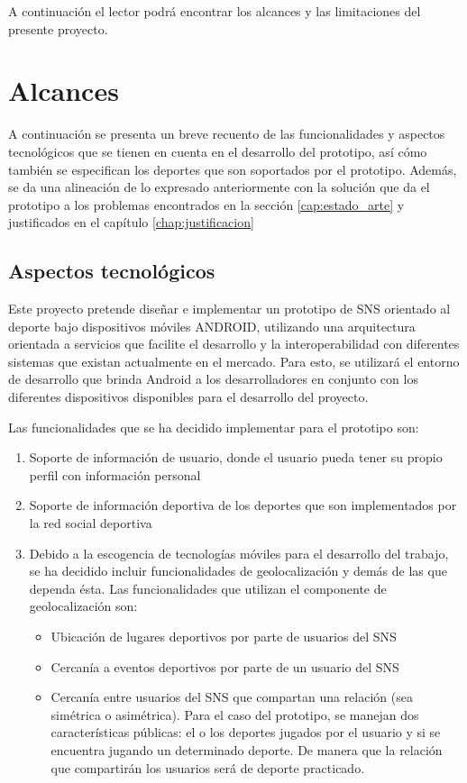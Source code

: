 A continuación el lector podrá encontrar los alcances y las limitaciones del presente proyecto.

\section{Alcances}

A continuación se presenta un breve recuento de las funcionalidades y aspectos tecnológicos que se tienen en cuenta en el desarrollo del prototipo, así cómo también se especifican los deportes que son soportados por el prototipo. Además, se da una alineación de lo expresado anteriormente con la solución que da el prototipo a los problemas encontrados en la sección \ref{cap:estado_arte} y justificados en el capítulo \ref{chap:justificacion}

\subsection{Aspectos tecnológicos}

Este proyecto pretende diseñar e implementar un prototipo de SNS orientado al deporte bajo dispositivos móviles ANDROID, utilizando una arquitectura orientada a servicios que facilite el desarrollo y la interoperabilidad con diferentes sistemas que existan actualmente en el mercado. Para esto, se utilizará el entorno de desarrollo que brinda Android a los desarrolladores en conjunto con los diferentes dispositivos disponibles para el desarrollo del proyecto.

Las funcionalidades que se ha decidido implementar para el prototipo son:

\begin{enumerate}

	\item Soporte de información de usuario, donde el usuario pueda tener su propio perfil con información personal 
	
	\item Soporte de información deportiva de los deportes que son implementados por la red social deportiva

	\item Debido a la escogencia de tecnologías móviles para el desarrollo del trabajo, se ha decidido incluir funcionalidades de geolocalización y demás de las que dependa ésta. Las funcionalidades que utilizan el componente de geolocalización son:

\begin{itemize}
  \item Ubicación de lugares deportivos por parte de usuarios del SNS
  \item Cercanía a eventos deportivos por parte de un usuario del SNS
  \item Cercanía entre usuarios del SNS que compartan una relación (sea simétrica o asimétrica). Para el caso del prototipo, se manejan dos características públicas: el o los deportes jugados por el usuario y si se encuentra jugando un determinado deporte. De manera que la relación que compartirán los usuarios será de deporte practicado.
\end{itemize}

\end{enumerate}

